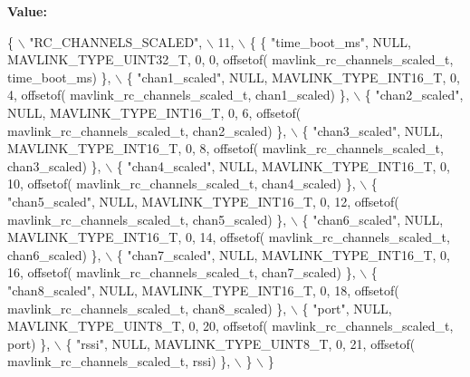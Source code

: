 {\bfseries Value\+:}
\begin{DoxyCode}
\{ \(\backslash\)
    \textcolor{stringliteral}{"RC\_CHANNELS\_SCALED"}, \(\backslash\)
    11, \(\backslash\)
    \{  \{ \textcolor{stringliteral}{"time\_boot\_ms"}, NULL, MAVLINK_TYPE_UINT32_T, 0, 0, offsetof(
      mavlink_rc_channels_scaled_t, time\_boot\_ms) \}, \(\backslash\)
         \{ \textcolor{stringliteral}{"chan1\_scaled"}, NULL, MAVLINK_TYPE_INT16_T, 0, 4, offsetof(
      mavlink_rc_channels_scaled_t, chan1\_scaled) \}, \(\backslash\)
         \{ \textcolor{stringliteral}{"chan2\_scaled"}, NULL, MAVLINK_TYPE_INT16_T, 0, 6, offsetof(
      mavlink_rc_channels_scaled_t, chan2\_scaled) \}, \(\backslash\)
         \{ \textcolor{stringliteral}{"chan3\_scaled"}, NULL, MAVLINK_TYPE_INT16_T, 0, 8, offsetof(
      mavlink_rc_channels_scaled_t, chan3\_scaled) \}, \(\backslash\)
         \{ \textcolor{stringliteral}{"chan4\_scaled"}, NULL, MAVLINK_TYPE_INT16_T, 0, 10, offsetof(
      mavlink_rc_channels_scaled_t, chan4\_scaled) \}, \(\backslash\)
         \{ \textcolor{stringliteral}{"chan5\_scaled"}, NULL, MAVLINK_TYPE_INT16_T, 0, 12, offsetof(
      mavlink_rc_channels_scaled_t, chan5\_scaled) \}, \(\backslash\)
         \{ \textcolor{stringliteral}{"chan6\_scaled"}, NULL, MAVLINK_TYPE_INT16_T, 0, 14, offsetof(
      mavlink_rc_channels_scaled_t, chan6\_scaled) \}, \(\backslash\)
         \{ \textcolor{stringliteral}{"chan7\_scaled"}, NULL, MAVLINK_TYPE_INT16_T, 0, 16, offsetof(
      mavlink_rc_channels_scaled_t, chan7\_scaled) \}, \(\backslash\)
         \{ \textcolor{stringliteral}{"chan8\_scaled"}, NULL, MAVLINK_TYPE_INT16_T, 0, 18, offsetof(
      mavlink_rc_channels_scaled_t, chan8\_scaled) \}, \(\backslash\)
         \{ \textcolor{stringliteral}{"port"}, NULL, MAVLINK_TYPE_UINT8_T, 0, 20, offsetof(
      mavlink_rc_channels_scaled_t, port) \}, \(\backslash\)
         \{ \textcolor{stringliteral}{"rssi"}, NULL, MAVLINK_TYPE_UINT8_T, 0, 21, offsetof(
      mavlink_rc_channels_scaled_t, rssi) \}, \(\backslash\)
         \} \(\backslash\)
\}
\end{DoxyCode}
\mbox{\label{mavlink__msg__rc__channels__scaled_8h_a0c81cda94135879b3735443ddb51be68}} 
